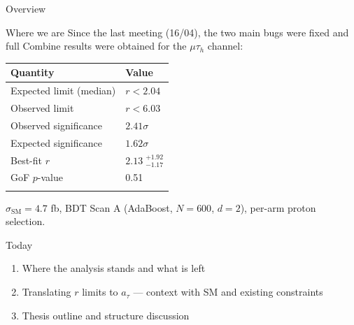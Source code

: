\begin{frame}{Overview}
\protect{}\label{overview}
\begin{block}{Where we are}
\protect{}\label{where-we-are}
Since the last meeting (16/04), the two main bugs were fixed and full
Combine results were obtained for the \(\mu\tau_h\) channel:

{\def\LTcaptype{none} %
\begin{longtable}[]{@{}ll@{}}
\toprule\noalign{}
Quantity & Value \\
\midrule\noalign{}
\endhead
Expected limit (median) & \(r < 2.04\) \\
Observed limit & \(r < 6.03\) \\
Observed significance & \(2.41\sigma\) \\
Expected significance & \(1.62\sigma\) \\
Best-fit \(r\) & \(2.13\;^{+1.92}_{-1.17}\) \\
GoF \(p\)-value & 0.51 \\
\bottomrule\noalign{}
\end{longtable}
}

\(\sigma_\text{SM} = 4.7\) fb, BDT Scan A (AdaBoost, \(N=600\),
\(d=2\)), per-arm proton selection.
\end{block}

\begin{block}{Today}
\protect{}\label{today}
\begin{enumerate}
\tightlist
\item
  Where the analysis stands and what is left
\item
  Translating \(r\) limits to \(a_\tau\) --- context with SM and
  existing constraints
\item
  Thesis outline and structure discussion
\end{enumerate}
\end{block}
\end{frame}

